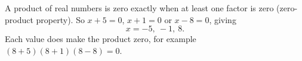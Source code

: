 A product of real numbers is zero exactly when at least one factor is zero (zero-product property). So $x+5=0$, $x+1=0$ or $x-8=0$, giving
\[
x=\boxed{-5,\ -1,\ 8}.
\]
Each value does make the product zero, for example $(8+5)(8+1)(8-8)=0$.
